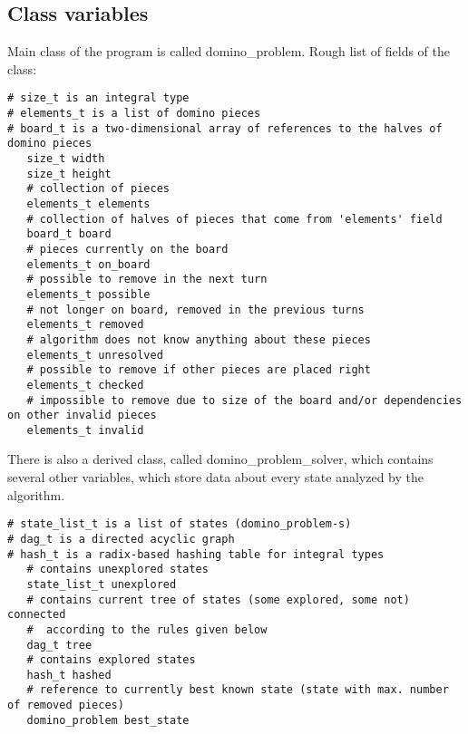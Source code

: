\subsection{Class variables}
Main class of the program is called domino\_problem. Rough list of fields of the class:

\begin{verbatim}
# size_t is an integral type
# elements_t is a list of domino pieces
# board_t is a two-dimensional array of references to the halves of domino pieces
   size_t width
   size_t height
   # collection of pieces
   elements_t elements
   # collection of halves of pieces that come from 'elements' field
   board_t board
   # pieces currently on the board
   elements_t on_board
   # possible to remove in the next turn
   elements_t possible
   # not longer on board, removed in the previous turns
   elements_t removed
   # algorithm does not know anything about these pieces
   elements_t unresolved
   # possible to remove if other pieces are placed right
   elements_t checked
   # impossible to remove due to size of the board and/or dependencies on other invalid pieces
   elements_t invalid
\end{verbatim}

There is also a derived class, called domino\_problem\_solver, which contains several other
variables, which store data about every state analyzed by the algorithm.

\begin{verbatim}
# state_list_t is a list of states (domino_problem-s)
# dag_t is a directed acyclic graph
# hash_t is a radix-based hashing table for integral types
   # contains unexplored states
   state_list_t unexplored
   # contains current tree of states (some explored, some not) connected
   #  according to the rules given below
   dag_t tree
   # contains explored states
   hash_t hashed
   # reference to currently best known state (state with max. number of removed pieces)
   domino_problem best_state
\end{verbatim}


